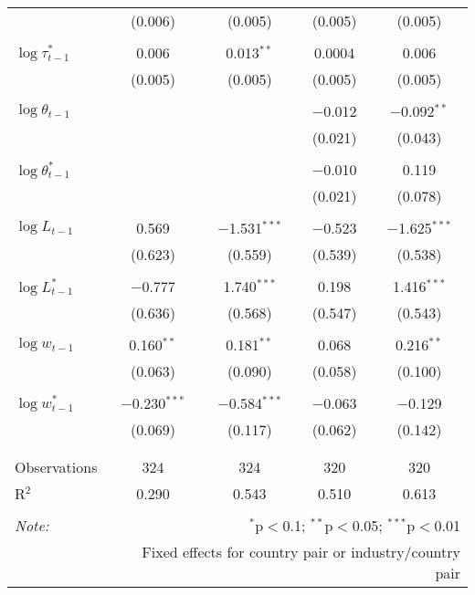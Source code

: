 \begin{tabular}{@{\extracolsep{5pt}}lcccc}
  & (0.006) & (0.005) & (0.005) & (0.005) \\ 
  & & & & \\ 
 $\log \tau_{t-1}^*$ & 0.006 & 0.013$^{**}$ & 0.0004 & 0.006 \\ 
  & (0.005) & (0.005) & (0.005) & (0.005) \\ 
  & & & & \\ 
 $\log \theta_{t-1}$ &  &  & $-$0.012 & $-$0.092$^{**}$ \\ 
  &  &  & (0.021) & (0.043) \\ 
  & & & & \\ 
 $\log \theta_{t-1}^*$ &  &  & $-$0.010 & 0.119 \\ 
  &  &  & (0.021) & (0.078) \\ 
  & & & & \\ 
 $\log L_{t-1}$ & 0.569 & $-$1.531$^{***}$ & $-$0.523 & $-$1.625$^{***}$ \\ 
  & (0.623) & (0.559) & (0.539) & (0.538) \\ 
  & & & & \\ 
 $\log L_{t-1}^*$ & $-$0.777 & 1.740$^{***}$ & 0.198 & 1.416$^{***}$ \\ 
  & (0.636) & (0.568) & (0.547) & (0.543) \\ 
  & & & & \\ 
 $\log w_{t-1}$ & 0.160$^{**}$ & 0.181$^{**}$ & 0.068 & 0.216$^{**}$ \\ 
  & (0.063) & (0.090) & (0.058) & (0.100) \\ 
  & & & & \\ 
 $\log w_{t-1}^*$ & $-$0.230$^{***}$ & $-$0.584$^{***}$ & $-$0.063 & $-$0.129 \\ 
  & (0.069) & (0.117) & (0.062) & (0.142) \\ 
  & & & & \\ 
\hline \\[-1.8ex] 
Observations & 324 & 324 & 320 & 320 \\ 
R$^{2}$ & 0.290 & 0.543 & 0.510 & 0.613 \\ 
\hline 
\hline \\[-1.8ex] 
\textit{Note:}  & \multicolumn{4}{r}{$^{*}$p$<$0.1; $^{**}$p$<$0.05; $^{***}$p$<$0.01} \\ 
 & \multicolumn{4}{r}{Fixed effects for country pair or industry/country pair} \\ 
\end{tabular} 
